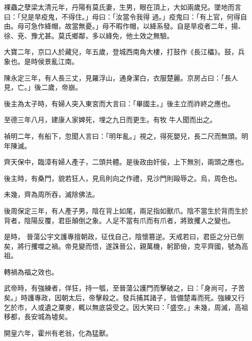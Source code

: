 \begin{pinyinscope}
 裸蟲之孽梁太清元年，丹陽有莫氏妻，生男，眼在頂上，大如兩歲兒。墜地而言曰：「兒是旱疫鬼，不得住。」母曰：「汝當令我得
 過。」疫鬼曰：「有上官，何得自由。母可急作絳帽，故當無憂。」母不暇作帽，以絳系發。自是旱疫者二年，揚、徐、兗、豫尤甚。莫氏鄉鄰，多以絳免，他土效之無驗。



 大寶二年，京口人於藏兒，年五歲，登城西南角大樓，打鼓作《長江櫑》。鼓，兵象也。是時侯景亂江南。



 陳永定三年，有人長三丈，見羅浮山，通身潔白，衣服楚麗。京房占曰：「長人見，亡。」後二歲，帝崩。



 後主為太子時，有婦人突入東宮而大言曰：「畢國主。」後主立而祚終之應也。



 至德三年八月，建康人家婢死，埋之九日而更生。有牧
 牛人聞而出之。



 禎明二年，有船下，忽聞人言曰：「明年亂。」視之，得死嬰兒，長二尺而無頭。明年陳滅。



 齊天保中，臨漳有婦人產子，二頭共體。是後政由奸佞，上下無別，兩頭之應也。



 後主時，有桑門，貌若狂人，見烏則向之作禮，見沙門則毆辱之。烏，周色也。



 未幾，齊為周所吞，滅除佛法。



 後周保定三年，有人產子男，陰在背上如尾，兩足指如獸爪。陰不當生於背而生於背者，陰陽反覆，君臣顛倒之象。人足不當有爪而有爪者，將致攫人之變也。



 是時，
 晉蕩公宇文護專擅朝政，征伐自己，陰懷篡逆。天戒若曰，君臣之分已倒矣，將行攫噬之禍。帝見變而悟，遂誅晉公，親萬機，躬節儉，克平齊國，號為高祖。



 轉禍為福之效也。



 武帝時，有強練者，佯狂，持一瓠，至晉蕩公護門而擊破之，曰：「身尚可，子苦矣。」時護專政，因朝太后，帝擊殺之。發兵捕其諸子，皆備楚毒而死。強練又行乞於市，人或遺之粟麥，輒以無底袋受之。因大笑曰：「盛空。」未幾，周滅，高祖移都，長安城為墟矣。



 開皇六年，霍州有老翁，化為猛獸。




\end{pinyinscope}

